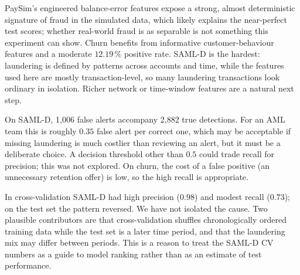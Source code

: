 \documentclass[10pt,twocolumn,a4paper]{article}
\newcommand{\pct}{\,\%}
\begin{document}
PaySim's engineered balance-error features expose a strong, almost deterministic signature of fraud in the simulated data, which likely explains the near-perfect test scores; whether real-world fraud is as separable is not something this experiment can show. Churn benefits from informative customer-behaviour features and a moderate $12.19\pct$ positive rate. SAML-D is the hardest: laundering is defined by patterns across accounts and time, while the features used here are mostly transaction-level, so many laundering transactions look ordinary in isolation. Richer network or time-window features are a natural next step.

On SAML-D, 1,006 false alerts accompany 2,882 true detections. For an AML team this is roughly $0.35$ false alert per correct one, which may be acceptable if missing laundering is much costlier than reviewing an alert, but it must be a deliberate choice. A decision threshold other than $0.5$ could trade recall for precision; this was not explored. On churn, the cost of a false positive (an unnecessary retention offer) is low, so the high recall is appropriate.

In cross-validation SAML-D had high precision ($0.98$) and modest recall ($0.73$); on the test set the pattern reversed. We have not isolated the cause. Two plausible contributors are that cross-validation shuffles chronologically ordered training data while the test set is a later time period, and that the laundering mix may differ between periods. This is a reason to treat the SAML-D CV numbers as a guide to model ranking rather than as an estimate of test performance.
\end{document}
